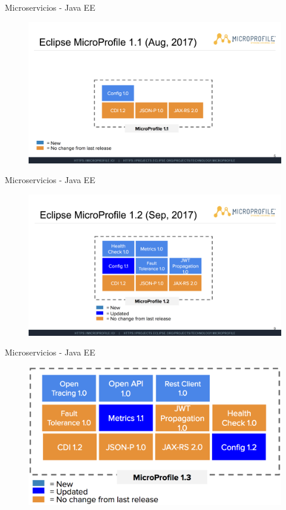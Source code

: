 \documentclass{beamer}
\begin{document}
\begin{frame}{Microservicios - Java EE}
\begin{figure}
\centering
\includegraphics[width=\linewidth]{Images/mp2}
\end{figure}
\end{frame}

\begin{frame}{Microservicios - Java EE}
\begin{figure}
\centering
\includegraphics[width=\linewidth]{Images/mp3}
\end{figure}
\end{frame}

\begin{frame}{Microservicios - Java EE}
\begin{figure}
	\centering
	\includegraphics[width=\linewidth]{Images/mp4}
\end{figure}
\end{frame}
\end{document}
